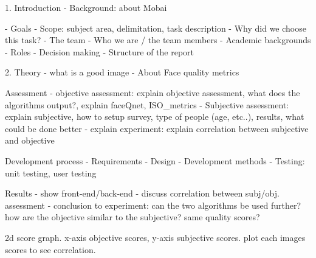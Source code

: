 
1. Introduction 
 - Background: about Mobai

 - Goals
 - Scope: subject area, delimitation, task description
 - Why did we choose this task?
 - The team
   - Who we are / the team members
   - Academic backgrounds
   - Roles
   - Decision making
 - Structure of the report
 
2. Theory
  - what is a good image
  - About Face quality metrics
  
  Assessment
  - objective assessment: explain objective assessment, what does the algorithms output?, explain faceQnet, ISO_metrics
  - Subjective assessment: explain subjective, how to setup survey, type of people (age, etc..), results, what could be done better
  - explain experiment: explain correlation between subjective and objective
  
  Development process
  - Requirements
  - Design
  - Development methods
  - Testing: unit testing, user testing
  
  Results
  - show front-end/back-end
  - discuss correlation between subj/obj. assessment
  - conclusion to experiment: can the two algorithms be used further? how are the objective similar to the subjective? same quality scores? 
  
 
 2d score graph. x-axis objective scores, y-axis subjective scores. plot each images scores to see correlation.
 